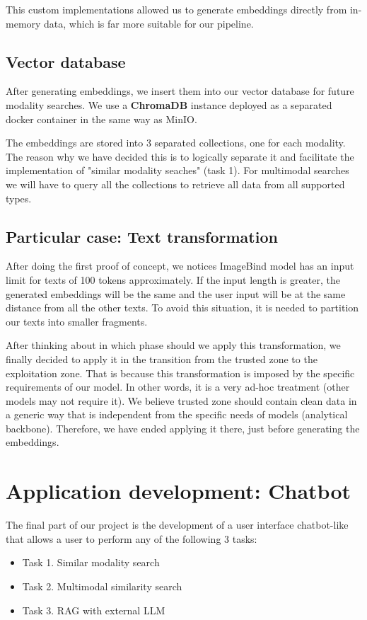 \documentclass[12pt]{article}
\begin{document}
This custom implementations allowed us to generate embeddings directly from in-memory data, which is far more suitable for our pipeline. 

\subsection{Vector database}
After generating embeddings, we insert them into our vector database for future modality searches. We use a \textbf{ChromaDB} instance deployed as a separated docker container in the same way as MinIO. 

The embeddings are stored into 3 separated collections, one for each modality. The reason why we have decided this is to logically separate it and facilitate the implementation of "similar modality seaches" (task 1). For multimodal searches we will have to query all the collections to retrieve all data from all supported types.

\subsection{Particular case: Text transformation}
After doing the first proof of concept, we notices ImageBind model has an input limit for texts of 100 tokens approximately. If the input length is greater, the generated embeddings will be the same and the user input will be at the same distance from all the other texts. To avoid this situation, it is needed to partition our texts into smaller fragments.

After thinking about in which phase should we apply this transformation, we finally decided to apply it in the transition from the trusted zone to the exploitation zone. That is because this transformation is imposed by the specific requirements of our model. In other words, it is a very ad-hoc treatment (other models may not require it). We believe trusted zone should contain clean data in a generic way that is independent from the specific needs of models (analytical backbone). Therefore, we have ended applying it there, just before generating the embeddings.

\section{Application development: Chatbot}
The final part of our project is the development of a user interface chatbot-like that allows a user to perform any of the following 3 tasks:
\begin{itemize}
    \item Task 1. Similar modality search
    \item Task 2. Multimodal similarity search
    \item Task 3. RAG with external LLM
\end{itemize}
\end{document}
